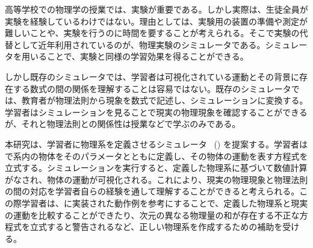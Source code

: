 
高等学校での物理学の授業では、実験が重要である。しかし実際は、生徒全員が実験を経験しているわけではない。理由としては、実験用の装置の準備や測定が難しいことや、実験を行うのに時間を要することが考えられる。そこで実験の代替として近年利用されているのが、物理実験のシミュレータである。シミュレータを用いることで、実験と同様の学習効果を得ることができる。

しかし既存のシミュレータでは、学習者は可視化されている運動とその背景に存在する数式の間の関係を理解することは容易ではない。既存のシミュレータでは、教育者が物理法則から現象を数式で記述し、シミュレーションに変換する。学習者はシミュレーションを見ることで現実の物理現象を確認することができるが、それと物理法則との関係性は授業などで学ぶのみである。

本研究は、学習者に物理系を定義させるシミュレータ \simnamealt~(\simname) を提案する。学習者は \simname で系内の物体をそのパラメータとともに定義し、その物体の運動を表す方程式を立式する。シミュレーションを実行すると、定義した物理系に基づいて数値計算がなされ、物体の運動が可視化される。これにより、現実の物理現象と物理法則の間の対応を学習者自らの経験を通して理解することができると考えられる。この際学習者は、\simname に実装された動作例を参考にすることで、定義した物理系と現実の運動を比較することができたり、次元の異なる物理量の和が存在する不正な方程式を立式すると警告されるなど、正しい物理系を作成するための補助を受ける。

